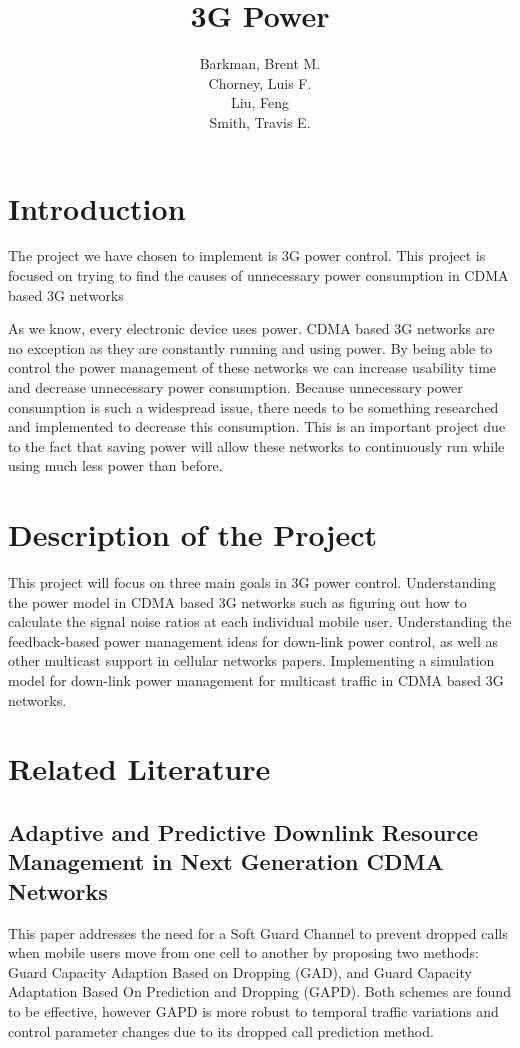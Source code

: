 \documentclass{article}
\title{3G Power}
\author{Barkman, Brent M.\\ Chorney, Luis F.\\ Liu, Feng\\ Smith, Travis E.}
\begin{document}
\maketitle

\section{Introduction}

The project we have chosen to implement is 3G power control. This
project is focused on trying to find the causes of unnecessary power
consumption in CDMA based 3G networks

As we know, every electronic device uses power. CDMA based 3G networks
are no exception as they are constantly running and using power. By
being able to control the power management of these networks we can
increase usability time and decrease unnecessary power consumption.
Because unnecessary power consumption is such a widespread issue,
there needs to be something researched and implemented to decrease
this consumption. This is an important project due to the fact that
saving power will allow these networks to continuously run while
using much less power than before.

\section{Description of the Project}

This project will focus on three main goals in 3G power control.
Understanding the power model in CDMA based 3G networks such as
figuring out how to calculate the signal noise ratios at each
individual mobile user. Understanding the feedback-based power
management ideas for down-link power control, as well as other
multicast support in cellular networks papers. Implementing a
simulation model for down-link power management for multicast traffic
in CDMA based 3G networks.

\section{Related Literature}

\subsection{Adaptive and Predictive Downlink Resource Management in
  Next Generation CDMA Networks}

This paper addresses the need for a Soft Guard Channel to prevent
dropped calls when mobile users move from one cell to another by
proposing two methods: Guard Capacity Adaption Based on Dropping
(GAD), and Guard Capacity Adaptation Based On Prediction and Dropping
(GAPD). Both schemes are found to be effective, however GAPD is more
robust to temporal traffic variations and control parameter changes
due to its dropped call prediction method.~\cite{wang2005adaptive}
\end{document}
